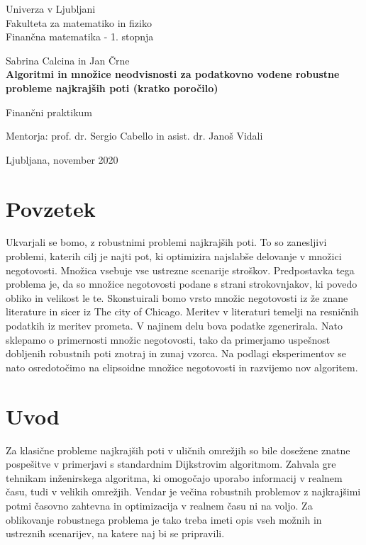\documentclass[a4paper, 12 pt]{article}
\theoremstyle{plain}
\theoremstyle{definition}
\theoremstyle{remark}
\begin{document}
\begin{titlepage}
		\begin{center}
		
		\large
		Univerza v Ljubljani\\
		\normalsize
		Fakulteta za matematiko in fiziko\\
		
		\small
		Finančna matematika - 1. stopnja\\
		
		\vspace{5 cm} 
		
		\large
		Sabrina Calcina in Jan Črne \\
		
		\vspace{0.5cm}
		\Large
		\textbf{Algoritmi in množice neodvisnosti za podatkovno vodene robustne probleme najkrajših poti  (kratko poročilo)}
		
		\vspace{0.5 cm}
		\normalsize
		Finančni praktikum
		
		\vspace{1.5cm}
		\normalsize
		Mentorja: prof. dr. Sergio Cabello in asist. dr. Janoš Vidali
		
		\vfill
		
		\large Ljubljana, november 2020
		
		\end{center}
\end{titlepage}

\section{Povzetek}

Ukvarjali se bomo, z  robustnimi problemi najkrajših poti. To so zanesljivi problemi, katerih cilj je najti pot, ki optimizira najslabše delovanje v množici negotovosti. Množica vsebuje vse ustrezne scenarije stroškov.
Predpostavka tega problema je, da so množice negotovosti podane s strani strokovnjakov, ki povedo obliko in velikost le te.
Skonstuirali bomo vrsto množic negotovosti iz že znane literature in sicer iz The city of Chicago. Meritev v literaturi temelji na resničnih podatkih iz meritev prometa. V najinem delu bova podatke zgenerirala. Nato sklepamo o primernosti množic negotovosti, tako da primerjamo uspešnost dobljenih robustnih poti znotraj in zunaj vzorca. 
Na podlagi eksperimentov se nato osredotočimo na elipsoidne množice negotovosti in razvijemo nov algoritem.

\section{Uvod}
Za klasične probleme najkrajših poti v uličnih omrežjih so bile dosežene znatne pospešitve v primerjavi s standardnim Dijkstrovim algoritmom. Zahvala gre tehnikam inženirskega algoritma, ki omogočajo uporabo informacij v realnem času, tudi v velikih omrežjih.
Vendar je večina robustnih problemov z najkrajšimi potmi časovno zahtevna in optimizacija v realnem času ni na voljo. Za oblikovanje robustnega problema je tako treba imeti opis vseh možnih in ustreznih scenarijev, na katere naj bi se pripravili.\newline
\end{document}
